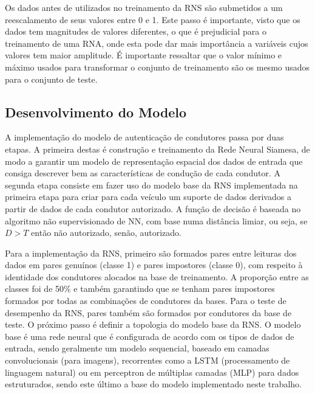 \documentclass[conference,harvard,brazil,english]{sbatex}
\begin{document}
Os dados antes de utilizados no treinamento da RNS são submetidos a um reescalamento de seus valores entre 0 e 1. Este passo é importante, visto que os dados tem magnitudes de valores diferentes, o que é prejudicial para o treinamento de uma RNA, onde esta pode dar mais importância a variáveis cujos valores tem maior amplitude. É importante ressaltar que o valor mínimo e máximo usados para transformar o conjunto de treinamento são os mesmo usados para o conjunto de teste. 



\subsection{Desenvolvimento do Modelo}

A implementação do modelo de autenticação de condutores passa por duas etapas. A primeira destas é construção e treinamento da Rede Neural Siamesa, de modo a garantir um modelo de representação espacial dos dados de entrada que consiga descrever bem as características de condução de cada condutor. A segunda etapa consiste em fazer uso do modelo base da RNS implementada na primeira etapa para criar para cada veículo um suporte de dados derivados a partir de dados de cada condutor autorizado. A função de decisão é baseada no algoritmo não supervisionado de NN, com base numa distância limiar, ou seja, se $D>T$ então não autorizado, senão, autorizado.

Para a implementação da RNS, primeiro são formados pares entre leituras dos dados em pares genuínos (classe 1) e pares impostores (classe 0), com respeito à identidade dos condutores alocados na base de treinamento. A proporção entre as classes foi de 50\% e também garantindo que se tenham pares impostores formados por todas as combinações de condutores da bases. Para o teste de desempenho da RNS, pares também são formados por condutores da base de teste. O próximo passo é definir a topologia do modelo base da RNS. O modelo base é uma rede neural que é configurada de acordo com os tipos de dados de entrada, sendo geralmente um modelo sequencial, baseado em camadas convolucionais (para imagens), recorrentes como a LSTM (processamento de linguagem natural) ou em perceptron de múltiplas camadas (MLP) para dados estruturados, sendo este último a base do modelo implementado neste trabalho.
\end{document}

